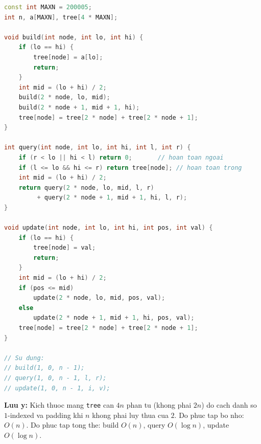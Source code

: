 \begin{lstlisting}[language=C++]
const int MAXN = 200005;
int n, a[MAXN], tree[4 * MAXN];

void build(int node, int lo, int hi) {
    if (lo == hi) {
        tree[node] = a[lo];
        return;
    }
    int mid = (lo + hi) / 2;
    build(2 * node, lo, mid);
    build(2 * node + 1, mid + 1, hi);
    tree[node] = tree[2 * node] + tree[2 * node + 1];
}

int query(int node, int lo, int hi, int l, int r) {
    if (r < lo || hi < l) return 0;       // hoan toan ngoai
    if (l <= lo && hi <= r) return tree[node]; // hoan toan trong
    int mid = (lo + hi) / 2;
    return query(2 * node, lo, mid, l, r)
         + query(2 * node + 1, mid + 1, hi, l, r);
}

void update(int node, int lo, int hi, int pos, int val) {
    if (lo == hi) {
        tree[node] = val;
        return;
    }
    int mid = (lo + hi) / 2;
    if (pos <= mid)
        update(2 * node, lo, mid, pos, val);
    else
        update(2 * node + 1, mid + 1, hi, pos, val);
    tree[node] = tree[2 * node] + tree[2 * node + 1];
}

// Su dung:
// build(1, 0, n - 1);
// query(1, 0, n - 1, l, r);
// update(1, 0, n - 1, i, v);
\end{lstlisting}

\textbf{Luu y:}
Kich thuoc mang \texttt{tree} can $4n$ phan tu (khong phai $2n$) do cach danh so $1$-indexed
va padding khi $n$ khong phai luy thua cua $2$.
Do phuc tap bo nho: $O(n)$.
Do phuc tap tong the: build $O(n)$, query $O(\log n)$, update $O(\log n)$.
